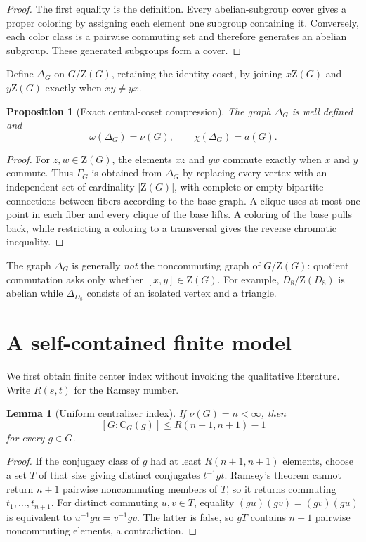\documentclass[11pt]{article}
\newtheorem{lemma}[theorem]{Lemma}
\newtheorem{proposition}[theorem]{Proposition}
\theoremstyle{remark}
\newcommand{\nuG}{\nu}
\newcommand{\aG}{a}
\newcommand{\Z}{\mathrm Z}
\newcommand{\CG}{\mathrm C}
\begin{document}
\begin{proof}
The first equality is the definition.  Every abelian-subgroup cover gives a
proper coloring by assigning each element one subgroup containing it.
Conversely, each color class is a pairwise commuting set and therefore
generates an abelian subgroup.  These generated subgroups form a cover.
\end{proof}

Define $\Delta_G$ on $G/\Z(G)$, retaining the identity coset, by joining
$x\Z(G)$ and $y\Z(G)$ exactly when $xy\ne yx$.

\begin{proposition}[Exact central-coset compression]\label{prop:compression}
The graph $\Delta_G$ is well defined and
\[
 \omega(\Delta_G)=\nuG(G),\qquad\chi(\Delta_G)=\aG(G).
\]
\end{proposition}

\begin{proof}
For $z,w\in\Z(G)$, the elements $xz$ and $yw$ commute exactly when $x$ and
$y$ commute.  Thus $\Gamma_G$ is obtained from $\Delta_G$ by replacing every
vertex with an independent set of cardinality $|\Z(G)|$, with complete or
empty bipartite connections between fibers according to the base graph.
A clique uses at most one point in each fiber and every clique of the base
lifts.  A coloring of the base pulls back, while restricting a coloring to
a transversal gives the reverse chromatic inequality.
\end{proof}

The graph $\Delta_G$ is generally \emph{not} the noncommuting graph of
$G/\Z(G)$: quotient commutation asks only whether $[x,y]\in\Z(G)$.  For
example, $D_8/\Z(D_8)$ is abelian while $\Delta_{D_8}$ consists of an
isolated vertex and a triangle.

\section{A self-contained finite model}

We first obtain finite center index without invoking the qualitative
literature.  Write $R(s,t)$ for the Ramsey number.

\begin{lemma}[Uniform centralizer index]\label{lem:bfc}
If $\nuG(G)=n<\infty$, then
\[
 [G:\CG_G(g)]\le R(n+1,n+1)-1
\]
for every $g\in G$.
\end{lemma}

\begin{proof}
If the conjugacy class of $g$ had at least $R(n+1,n+1)$ elements, choose a
set $T$ of that size giving distinct conjugates $t^{-1}gt$.  Ramsey's theorem
cannot return $n+1$ pairwise noncommuting members of $T$, so it returns
commuting $t_1,\dots,t_{n+1}$.  For distinct commuting $u,v\in T$, equality
$(gu)(gv)=(gv)(gu)$ is equivalent to $u^{-1}gu=v^{-1}gv$.  The latter is
false, so $gT$ contains $n+1$ pairwise noncommuting elements, a contradiction.
\end{proof}
\end{document}
